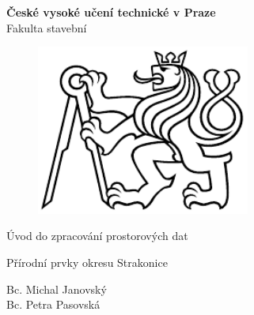 \documentclass[a4paper, 12pt]{article}
\begin{document}
\begin{titlepage}
\begin{center}
\noindent
\Large \textbf{České vysoké učení technické v Praze }\\ Fakulta stavební
\vspace{5cm}

\huge

\begin{figure}[h!]
	\centering
	\includegraphics[width=7cm]{logo.png}
\end{figure}

\vspace{0.5cm}

Úvod do zpracování prostorových dat \\

\vspace{3cm}

\Huge  
Přírodní prvky okresu Strakonice\\

\vspace{2cm}

\Large
Bc. Michal Janovský \\
Bc. Petra Pasovská \\

\end{center}

\end{titlepage}




\pagestyle{plain}     %
\setcounter{page}{1}  %

\tableofcontents
\newpage
\end{document}
